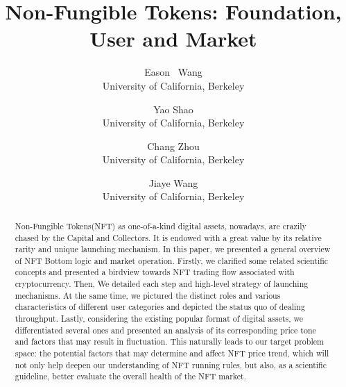 \usepackage{filecontents}



\date{}

\title{\Large \bf Non-Fungible Tokens: Foundation, User and Market}

\author{
{\rm Eason \ Wang}\\
University of California, Berkeley
\and
{\rm Yao Shao}\\
University of California, Berkeley
\and
{\rm Chang Zhou}\\
University of California, Berkeley
\and
{\rm Jiaye Wang}\\
University of California, Berkeley
} %

\maketitle

\begin{abstract}
Non-Fungible Tokens(NFT) as one-of-a-kind digital assets, nowadays, are crazily chased by the Capital and Collectors. It is endowed with a great value by its relative rarity and unique launching mechanism. In this paper, we presented a general overview of NFT Bottom logic and market operation. Firstly, we clarified some related scientific concepts and presented a birdview towards NFT trading flow associated with cryptocurrency. Then, We detailed each step and high-level strategy of launching mechanisms. At the same time, we pictured the distinct roles and various characteristics of different user categories and depicted the status quo of dealing throughput. Lastly, considering the existing popular format of digital assets, we differentiated several ones and presented an analysis of its corresponding price tone and factors that may result in fluctuation. This naturally leads to our target problem space: the potential factors that may determine and affect NFT price trend, which will not only help deepen our understanding of NFT running rules, but also, as a scientific guideline, better evaluate the overall health of the NFT market.

\end{abstract}


